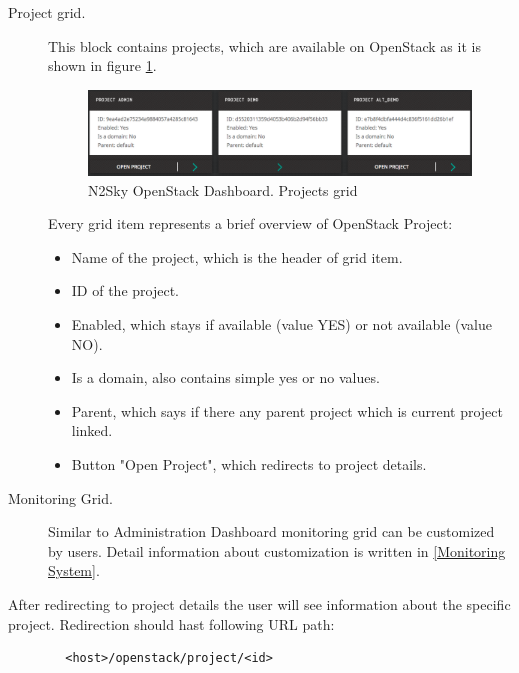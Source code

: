 \begin{description}
\item[Project grid.] This block contains projects, which are available on OpenStack as it is shown in figure \ref{fig:openstack_dashboard_projects}.

\begin{figure}[H]
\begin{center}
  \includegraphics[width=\linewidth]{components/4/pics/openstack_dashboard_projects.png}
  \caption{N2Sky OpenStack Dashboard. Projects grid}
  \label{fig:openstack_dashboard_projects}
\end{center}
\end{figure}

Every grid item represents a brief overview of OpenStack Project:

\begin{itemize}
\item Name of the project, which is the header of grid item.
\item ID of the project.
\item Enabled, which stays if available (value YES) or not available (value NO).
\item Is a domain, also contains simple yes or no values.
\item Parent, which says if there any parent project which is current project linked.
\item Button "Open Project", which redirects to project details.
\end{itemize}

\item[Monitoring Grid.] Similar to Administration Dashboard monitoring grid can be customized by users. Detail information about customization is written in \autoref{Monitoring System}. 

\end{description}

After redirecting to project details the user will see information about the specific project. Redirection should hast following URL path: 
\begin{lstlisting}
        <host>/openstack/project/<id>
\end{lstlisting}

